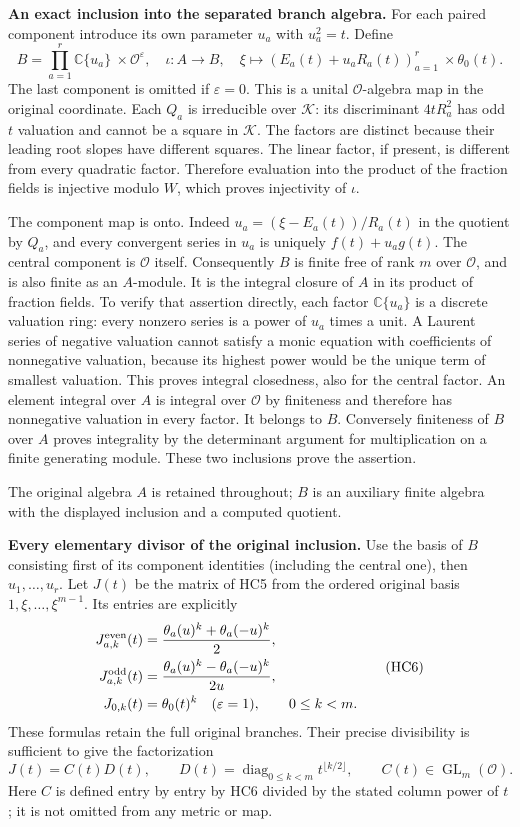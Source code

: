 \documentclass[11pt,a4paper]{article}
\theoremstyle{definition}\newtheorem{definition}[theorem]{Definition}
\begin{document}
\HC\textbf{An exact inclusion into the separated branch algebra.}
For each paired component introduce its own parameter $u_a$ with
$u_a^2=t$. Define
\[
 B=\prod_{a=1}^r\mathbb C\{u_a\}\ \times\mathcal O^{\varepsilon},
 \quad
 \iota:A\longrightarrow B,\quad
 \xi\longmapsto
       (E_a(t)+u_aR_a(t))_{a=1}^r\ \times\theta_0(t).
 \tag{HC5}
\]
The last component is omitted if $\varepsilon=0$. This is a
unital $\mathcal O$-algebra map in the original coordinate.
Each $Q_a$ is irreducible over $\mathcal K$: its discriminant
$4tR_a^2$ has odd $t$ valuation and cannot be a square in
$\mathcal K$. The factors are distinct because their leading
root slopes have different squares. The linear factor, if present,
is different from every quadratic factor. Therefore evaluation
into the product of the fraction fields is injective modulo $W$,
which proves injectivity of $\iota$.

The component map is onto. Indeed
$u_a=(\xi-E_a(t))/R_a(t)$ in the quotient by $Q_a$, and
every convergent series in $u_a$ is uniquely $f(t)+u_ag(t)$.
The central component is $\mathcal O$ itself. Consequently $B$
is finite free of rank $m$ over $\mathcal O$, and is also finite
as an $A$-module. It is the integral closure of $A$ in its product
of fraction fields. To verify that assertion directly, each factor
$\mathbb C\{u_a\}$ is a discrete valuation ring: every nonzero
series is a power of $u_a$ times a unit. A Laurent series of negative
valuation cannot satisfy a monic equation with coefficients of
nonnegative valuation, because its highest power would be the unique
term of smallest valuation. This proves integral closedness, also
for the central factor. An element integral over $A$ is integral
over $\mathcal O$ by finiteness and therefore has nonnegative
valuation in every factor. It belongs to $B$. Conversely finiteness
of $B$ over $A$ proves integrality by the determinant argument for
multiplication on a finite generating module. These two inclusions
prove the assertion.

The original algebra $A$ is retained throughout; $B$ is an auxiliary
finite algebra with the displayed inclusion and a computed quotient.

\HC\textbf{Every elementary divisor of the original inclusion.}
Use the basis of $B$ consisting first of its component identities
(including the central one), then $u_1,\ldots,u_r$. Let $J(t)$
be the matrix of HC5 from the ordered original basis
$1,\xi,\ldots,\xi^{m-1}$. Its entries are explicitly
\[
 \begin{split}
 J_{a,k}^{\rm even}(t)
  &=\frac{\theta_a(u)^k+\theta_a(-u)^k}{2},\\
 J_{a,k}^{\rm odd}(t)
  &=\frac{\theta_a(u)^k-\theta_a(-u)^k}{2u},\\
 J_{0,k}(t)&=\theta_0(t)^k\quad(\varepsilon=1),
       \qquad 0\le k<m.
 \end{split}
 \tag{HC6}
\]
These formulas retain the full original branches. Their precise
divisibility is sufficient to give the factorization
\[
 J(t)=C(t)D(t),\qquad
 D(t)=\operatorname{diag}_{0\le k<m}t^{\lfloor k/2\rfloor},
 \qquad C(t)\in\operatorname{GL}_m(\mathcal O).
 \tag{HC7}
\]
Here $C$ is defined entry by entry by HC6 divided by the stated
column power of $t$; it is not omitted from any metric or map.
\end{document}
